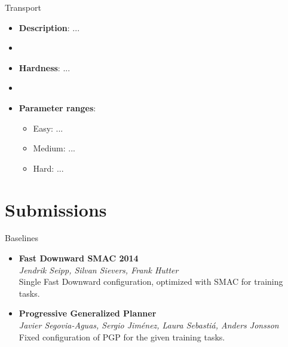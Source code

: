 \documentclass[aspectratio=169,xcolor=dvipsnames]{beamer}
\begin{document}
\begin{frame}{Transport}

    \begin{itemize}
        \item \textbf{Description}: ...
        \item[]
        \item \textbf{Hardness}: ...
        \item[]
        \item \textbf{Parameter ranges}:
        \begin{itemize}
            \item Easy: ...
            \item Medium: ...
            \item Hard: ...
        \end{itemize}
    \end{itemize}

\end{frame}

\section{Submissions}

\begin{frame}{Baselines}
\begin{itemize}
\item
    \textbf{Fast Downward SMAC 2014}\\
    \emph{Jendrik Seipp, Silvan Sievers, Frank Hutter}\\
    Single Fast Downward
    configuration, optimized with SMAC for training tasks.
\item
    \textbf{Progressive Generalized Planner}\\
    \emph{Javier
    Segovia-Aguas, Sergio Jiménez, Laura Sebastiá, Anders Jonsson}\\
    Fixed configuration of PGP for the given training tasks.
\end{itemize}
\end{frame}
\end{document}
